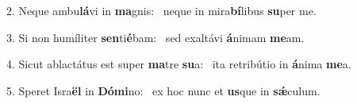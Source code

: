 2. Neque ambu\textbf{lá}vi in \textbf{ma}gnis: \ast\  neque in mira\textbf{bí}libus \textbf{su}per me.\

3. Si non humíliter \textbf{sen}ti\textbf{é}bam: \ast\  sed exaltávi \textbf{á}nimam \textbf{me}am.\

4. Sicut ablactátus est super \textbf{ma}tre \textbf{su}a: \ast\  ita retribútio in \textbf{á}nima \textbf{me}a.\

5. Speret Isra\textbf{ël} in \textbf{Dó}\textbf{mi}no: \ast\  ex hoc nunc et \textbf{us}que in \textbf{sǽ}culum.\

